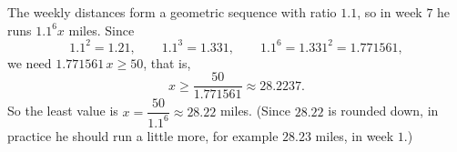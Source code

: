 The weekly distances form a geometric sequence with ratio $1.1$, so in week $7$ he runs $1.1^6x$ miles. Since
\[1.1^2=1.21,\qquad 1.1^3=1.331,\qquad 1.1^6=1.331^2=1.771561,\]
we need $1.771561\,x\ge50$, that is,
\[x\ge\dfrac{50}{1.771561}\approx28.2237 .\]
So the least value is $x=\dfrac{50}{1.1^6}\approx\boxed{28.22}$ miles. (Since $28.22$ is rounded down, in practice he should run a little more, for example $28.23$ miles, in week $1$.)
